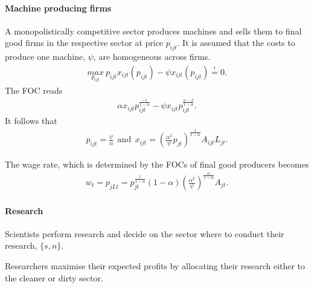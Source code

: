 \documentclass[12pt]{article}
\begin{document}
\paragraph{Machine producing firms}

A monopolistically competitive sector produces machines and sells them to final good firms in the respective sector at price $p_{ijt}$. It is assumed that the costs to produce one machine, $\psi$, are homogeneous across firms.
\begin{align*}
\underset{p_{ijt}}{max}\  p_{ijt}x_{ijt}(p_{ijt})-\psi x_{ijt}(p_{ijt}) \overset{!}{=}0.
\end{align*}
The FOC reads
\begin{align*}
\alpha x_{ijt}p_{ijt}^{\frac{-1}{1-\alpha}}-\psi x_{ijt}p_{ijt}^{\frac{\alpha-2}{1-\alpha}}.
\end{align*}
It follows that 
\begin{align*}
p_{ijt}=\frac{\psi}{\alpha}\ \ \text{and} \ \  x_{ijt}=\left(\frac{\alpha^2}{\psi}p_{jt}\right)^\frac{1}{1-\alpha}A_{ijt}L_{jt}.
\end{align*}

The wage rate, which is determined by the FOCs of final good producers becomes
\begin{align*}
w_t=p_{jLt}= p_{jt}^{\frac{1}{1-\alpha}}(1-\alpha)\left(\frac{\alpha^2}{\psi}\right)^\frac{\alpha}{1-\alpha}A_{jt}.
\end{align*}
\paragraph{Research}
Scientists perform research and decide on the sector where to conduct their research, $\{s,n\}$. 

Researchers maximise their expected profits by allocating their research either to the cleaner or dirty sector. 
\end{document}
